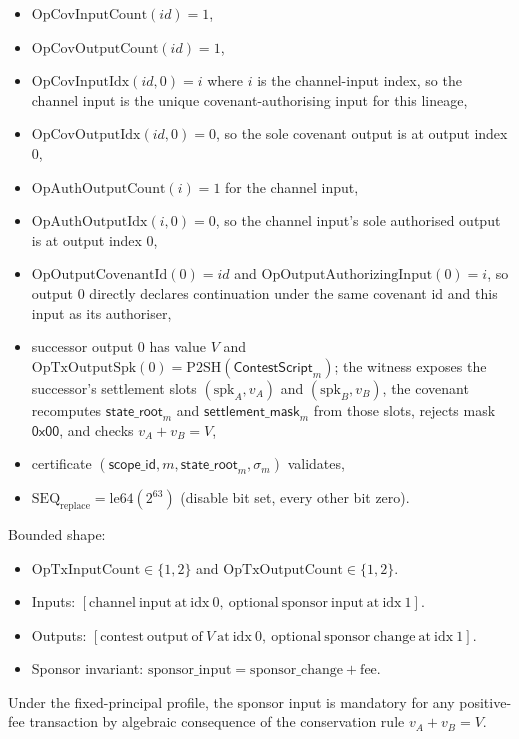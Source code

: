\documentclass[10pt,a4paper]{article}
\begin{document}
\begin{itemize}
  \item $\mathrm{OpCovInputCount}(id) = 1$,
  \item $\mathrm{OpCovOutputCount}(id) = 1$,
  \item $\mathrm{OpCovInputIdx}(id, 0) = i$ where $i$ is the channel-input index, so the channel input is the unique covenant-authorising input for this lineage,
  \item $\mathrm{OpCovOutputIdx}(id, 0) = 0$, so the sole covenant output is at output index 0,
  \item $\mathrm{OpAuthOutputCount}(i) = 1$ for the channel input,
  \item $\mathrm{OpAuthOutputIdx}(i, 0) = 0$, so the channel input's sole authorised output is at output index 0,
  \item $\mathrm{OpOutputCovenantId}(0)=id$ and $\mathrm{OpOutputAuthorizingInput}(0)=i$, so output 0 directly declares continuation under the same covenant id and this input as its authoriser,
  \item successor output 0 has value $V$ and $\mathrm{OpTxOutputSpk}(0)=\mathrm{P2SH}(\mathsf{ContestScript}_m)$; the witness exposes the successor's settlement slots $(\mathrm{spk}_A, v_A)$ and $(\mathrm{spk}_B, v_B)$, the covenant recomputes $\mathsf{state\_root}_m$ and $\mathsf{settlement\_mask}_m$ from those slots, rejects mask $\mathsf{0x00}$, and checks $v_A + v_B = V$,
  \item certificate $(\mathsf{scope\_id}, m, \mathsf{state\_root}_m, \sigma_m)$ validates,
  \item $\mathrm{SEQ}_{\mathrm{replace}} = \mathrm{le64}(2^{63})$ (disable bit set, every other bit zero).
\end{itemize}
Bounded shape:
\begin{itemize}
  \item $\mathrm{OpTxInputCount}\in\{1,2\}$ and $\mathrm{OpTxOutputCount}\in\{1,2\}$.
  \item Inputs: $[\mathrm{channel\ input\ at\ idx\ }0,\ \mathrm{optional\ sponsor\ input\ at\ idx\ }1]$.
  \item Outputs: $[\mathrm{contest\ output\ of\ }V \mathrm{\ at\ idx\ }0,\ \mathrm{optional\ sponsor\ change\ at\ idx\ }1]$.
  \item Sponsor invariant: $\mathrm{sponsor\_input} = \mathrm{sponsor\_change} + \mathrm{fee}$.
\end{itemize}
Under the fixed-principal profile, the sponsor input is mandatory for any positive-fee transaction by algebraic consequence of the conservation rule $v_A + v_B = V$.
\end{document}
